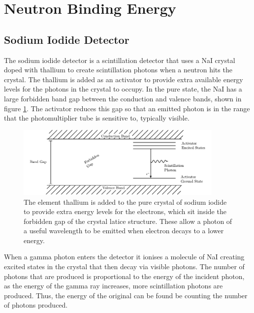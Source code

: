 
\section{Neutron Binding Energy} %
\label{sec:neutron_binding_energy}

\subsection{Sodium Iodide Detector} %
\label{ssub:sodium_iodide_detector}
The sodium iodide detector is a scintillation detector that uses a NaI crystal doped with thallium to create scintillation photons when a neutron hits the crystal. The thallium is added as an activator to provide extra available energy levels for the photons in the crystal to occupy. In the pure state, the NaI has a large forbidden band gap between the conduction and valence bands, shown in figure \ref{fig:thaliumactivator}. The activator reduces this gap so that an emitted photon is in the range that the photomultiplier tube is sensitive to, typically visible.
\begin{figure}[ht]
	\centering
	\includegraphics[width=0.9\textwidth]{NaIbands.pdf}
	\caption{The element thallium is added to the pure crystal of sodium iodide to provide extra energy levels for the electrons, which sit inside the forbidden gap of the crystal latice structure. These allow a photon of a useful wavelength to be emitted when electron decays to a lower energy.\label{fig:thaliumactivator}}
\end{figure}

When a gamma photon enters the detector it ionises a molecule of NaI creating excited states in the crystal that then decay via visible photons. The number of photons that are produced is proportional to the energy of the incident photon, as the energy of the gamma ray increases, more scintillation photons are produced. Thus, the energy of the original can be found be counting the number of photons produced. 

